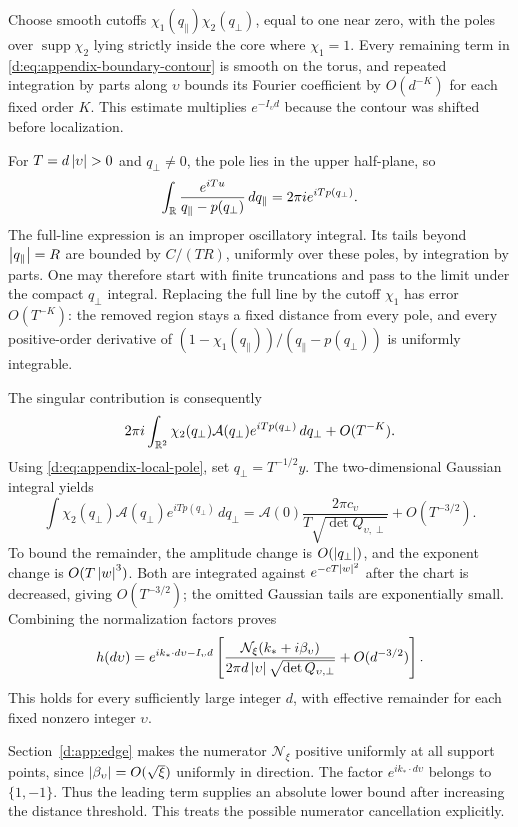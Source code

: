 Choose smooth cutoffs \(\chi_1(q_\parallel)\chi_2(q_\perp)\), equal to one near zero,
with the poles over \(\operatorname{supp}\chi_2\) lying strictly inside
the core where \(\chi_1=1\). Every remaining term in
\eqref{d:eq:appendix-boundary-contour} is smooth on the torus, and repeated
integration by parts along \(\upsilon\) bounds its Fourier coefficient by
\(O(d^{-K})\) for each fixed order \(K\). This estimate multiplies
\(e^{-I_\upsilon d}\) because the contour was shifted before localization.

For \(T=d\left\lvert \upsilon\right\rvert>0\) and \(q_\perp\ne0\), the pole lies in the upper
half-plane, so
\[
 \int_{\mathbb R}\frac{e^{iTu}}{q_\parallel-p(q_\perp)}\,dq_\parallel
   =2\pi i e^{iTp(q_\perp)}.
\]
The full-line expression is an improper oscillatory integral.
Its tails beyond \(\left\lvert q_\parallel\right\rvert=R\) are bounded by \(C/(TR)\), uniformly
over these poles, by integration by parts. One may therefore start with
finite truncations and pass to the limit under the compact \(q_\perp\) integral.
Replacing the full line by the cutoff \(\chi_1\) has error \(O(T^{-K})\):
the removed region stays a fixed distance from every pole, and every
positive-order derivative of \((1-\chi_1(q_\parallel))/(q_\parallel-p(q_\perp))\) is uniformly
integrable.

The singular contribution is consequently
\[
 2\pi i\int_{\mathbb R^2}\chi_2(q_\perp)\mathcal A(q_\perp)e^{iTp(q_\perp)}\,dq_\perp+O(T^{-K}).
\]
Using \eqref{d:eq:appendix-local-pole}, set \(q_\perp=T^{-1/2}y\).
The two-dimensional Gaussian integral yields
\[
 \int\chi_2(q_\perp)\mathcal A(q_\perp)e^{iTp(q_\perp)}\,dq_\perp
 =\mathcal A(0)\frac{2\pi c_\upsilon}{T\sqrt{\det Q_{\upsilon,\perp}}}
   +O(T^{-3/2}).
\]
To bound the remainder, the amplitude change is \(O(\left\lvert q_\perp\right\rvert)\),
and the exponent change is \(O(T\left\lvert w\right\rvert^3)\). Both are integrated
against \(e^{-cT\left\lvert w\right\rvert^2}\) after the chart is decreased, giving
\(O(T^{-3/2})\); the omitted Gaussian tails are exponentially small.
Combining the normalization factors proves
\begin{equation}
 h(d\upsilon)=e^{ik_*\cdot d\upsilon-I_\upsilon d}
 \left[
 \frac{\mathcal N_\xi(k_*+i\beta_\upsilon)}
 {2\pi d\left\lvert \upsilon\right\rvert\sqrt{\det Q_{\upsilon,\perp}}}
 +O(d^{-3/2})
 \right].
 \label{d:eq:appendix-green-asymptotic}
\end{equation}
This holds for every sufficiently large integer \(d\), with effective
remainder for each fixed nonzero integer \(\upsilon\).

Section~\ref{d:app:edge} makes the numerator \(\mathcal N_\xi\) positive
uniformly at all support points, since
\(\left\lvert \beta_\upsilon\right\rvert=O(\sqrt{\xi})\) uniformly in direction.
The factor \(e^{ik_*\cdot d\upsilon}\) belongs to \(\{1,-1\}\).
Thus the leading term supplies an absolute lower bound after increasing
the distance threshold. This treats the possible numerator cancellation
explicitly.

